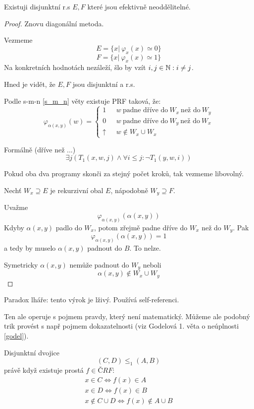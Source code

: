 \begin{theorem}
	Existuji disjunktní r.s $E, F$ které jsou efektivně neoddělitelné.
\end{theorem}
\begin{proof}
	Znovu diagonální metoda.

	Vezmeme
	\[ E = \{ x|\ \varphi_x(x) \simeq 0 \} \]
	\[ F = \{ x|\ \varphi_x(x) \simeq 1 \} \]
	Na konkretních hodnotách nezáleží, šlo by vzít $i, j \in \operatorname{\mathbb{N}}: i \ne j$.

	Hned je vidět, že $E, F$ jsou disjunktní a r.s.

	Podle s-m-n \cref{s_m_n} věty existuje PRF taková, že:
	\[ \varphi_{\alpha(x, y)} (w) =
		\left\{
		\begin{array}{lll}
			1 & \mbox{ } w \ \text{padne dříve do} \ W_x \ \text{než do} \ W_y \\
			0 & \mbox{ } w \ \text{padne dříve do} \ W_y \ \text{než do} \ W_x \\
			\uparrow & \mbox{ } w \notin W_x \cup W_x
		\end{array}
		\right.
	\]

	Formálně (dříve než ...)
	\[ \exists j (T_1(x, w, j) \land \forall i \leq j: \neg T_1(y, w, i)) \]

	Pokud oba dva programy skonči za stejný počet kroků, tak vezmeme libovolný.

	Nechť $W_x \supseteq E$ je rekurzivní obal $E$, nápodobně $W_y \supseteq F$.

	Uvažme
	\[ \varphi_{\alpha(x, y)}(\alpha(x, y)) \]
	Kdyby $\alpha(x, y)$ padlo do $W_x$, potom zřejmě padne dříve do $W_x$ než do $W_y$.
	Pak
	\[ \varphi_{\alpha(x, y)}(\alpha(x, y)) = 1 \]
	a tedy by muselo $\alpha(x, y)$ padnout do $B$. To nelze.

	Symetricky $\alpha(x, y)$ nemůže padnout do $W_y$ neboli
	\[ \alpha(x, y) \notin W_x \cup W_y \]

\end{proof}

\begin{note}
	Paradox lháře: tento výrok je lživý.
	Používá self-referenci.

	Ten ale operuje s pojmem pravdy, který není matematický.
	Můžeme ale podobný trik provést s např pojmem dokazatelnosti (viz Godelová 1. věta o neúplnosti \cref{godel}).
\end{note}

\begin{definition}
	Disjunktní dvojice
	\[ (C, D) \leq_1 (A, B) \]
	právě když existuje prostá $f \in ČRF$:
	\begin{gather*}
		x \in C \iff f(x) \in A\\
		x \in D \iff f(x) \in B\\
		x \notin C \cup D \iff f(x) \notin A \cup B
	\end{gather*}
\end{definition}

